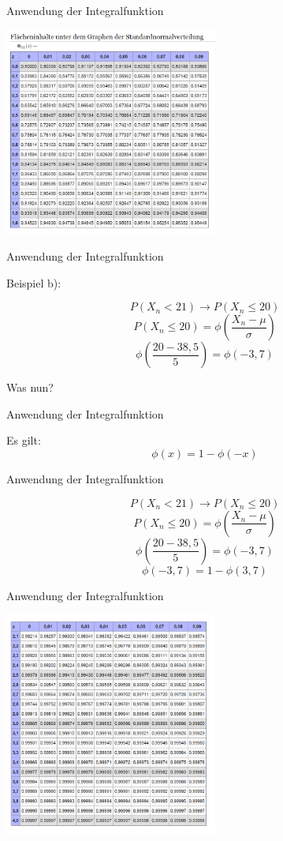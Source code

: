 \documentclass[14pt]{beamer}
\begin{document}
\begin{frame} {Anwendung der Integralfunktion}
 
 \includegraphics[width=7.0cm]{TabelleNormalverteilung.png}

\end{frame}
\begin{frame} {Anwendung der Integralfunktion}

Beispiel b):
 
 $$P(X_n < 21) \rightarrow P(X_n \le 20)$$
 $$P(X_n \le 20) =  \phi\left(\frac{X_n - \mu}{\sigma}\right)$$
 $$ \phi\left(\frac{20 - 38,5}{5}\right) = \phi(-3,7) $$
 
 Was nun?

\end{frame}
\begin{frame} {Anwendung der Integralfunktion}
 
 Es gilt:
 $$ \phi(x) = 1 - \phi(-x) $$

\end{frame}

\begin{frame} {Anwendung der Integralfunktion}
 
 $$P(X_n < 21) \rightarrow P(X_n \le 20)$$
 $$P(X_n \le 20) =  \phi\left(\frac{X_n - \mu}{\sigma}\right)$$
 $$ \phi\left(\frac{20 - 38,5}{5}\right) = \phi(-3,7) $$
 $$ \phi(-3,7) = 1 - \phi(3,7)$$

\end{frame}

\begin{frame} {Anwendung der Integralfunktion}

 \includegraphics[width=7.0cm]{TabelleNormalverteilung2.png}

\end{frame}
\end{document}
